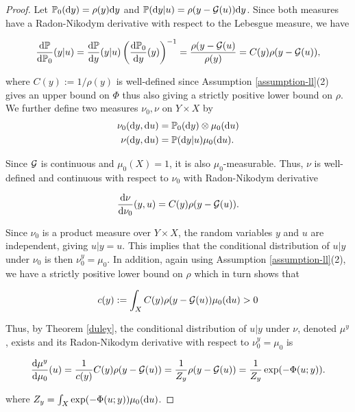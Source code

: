 \begin{proof}
  Let $\mathbb{P}_0(\text{d} y) = \rho(y)\text{d} y$ and $\mathbb{P}(\text{d} y|u) = \rho(y - \mathcal{G} (u))\text{d} y$. Since both measures have a Radon-Nikodym derivative with respect to the Lebesgue measure, we have

  \begin{equation*}
    \frac{\text{d} \mathbb{P}}{\text{d} \mathbb{P}_0}(y|u) = \frac{\text{d} \mathbb{P}}{\text{d} y}(y|u)\left(\frac{\text{d} \mathbb{P}_0}{\text{d} y}(y)\right)^{-1} = \frac{\rho(y - \mathcal{G} (u)}{\rho(y)} = C(y)\rho(y - \mathcal{G} (u)),
  \end{equation*}

  where $C(y) := 1 / \rho(y)$ is well-defined since Assumption \ref{assumption-ll}(2) gives an upper bound on $\Phi$ thus also giving a strictly positive lower bound on $\rho$. We further define two measures $\nu_0, \nu$ on $Y \times X$ by
  \begin{equation*}
    \begin{aligned}
      \nu_0(\text{d} y, \text{d} u) &= \mathbb{P}_0(\text{d} y) \otimes \mu_0(\text{d} u)\\
      \nu(\text{d} y, \text{d} u) &= \mathbb{P}(\text{d} y|u) \mu_0(\text{d} u).
    \end{aligned}
  \end{equation*}
  
  Since $\mathcal{G}$ is continuous and $\mu_0(X) = 1$, it is also $\mu_0$-measurable. Thus, $\nu$ is well-defined and continuous with respect to $\nu_0$ with Radon-Nikodym derivative

  \begin{equation*}
    \frac{\text{d} \nu}{\text{d} \nu_0}(y, u) = C(y)\rho(y - \mathcal{G}(u)).
  \end{equation*}

  Since $\nu_0$ is a product measure over $Y \times X$, the random variables $y$ and $u$ are independent, giving $u|y = u$. This implies that the conditional distribution of $u|y$ under $\nu_0$ is then $\nu_0^y = \mu_0$. In addition, again using Assumption \ref{assumption-ll}(2), we have a strictly positive lower bound on $\rho$ which in turn shows that

  \begin{equation*}
    c(y) := \int_X C(y)\rho(y - \mathcal{G}(u))\mu_0(\text{d} u) > 0 
  \end{equation*}

  Thus, by Theorem \ref{duley}, the conditional distribution of $u|y$ under $\nu$, denoted $\mu^y$, exists and its Radon-Nikodym derivative with respect to $\nu_0^y = \mu_0$ is

  \begin{equation*}
    \frac{\text{d} \mu^y}{\text{d} \mu_0}(u) = \frac1{c(y)}C(y)\rho(y - \mathcal{G} (u)) =  \frac1{Z_y}\rho(y - \mathcal{G} (u)) = \frac1{Z_y}\exp(-\Phi(u;y)).
  \end{equation*}
  
  where $Z_y = \int_X\exp(-\Phi(u;y))\mu_0(\text{d} u)$.
\end{proof}

